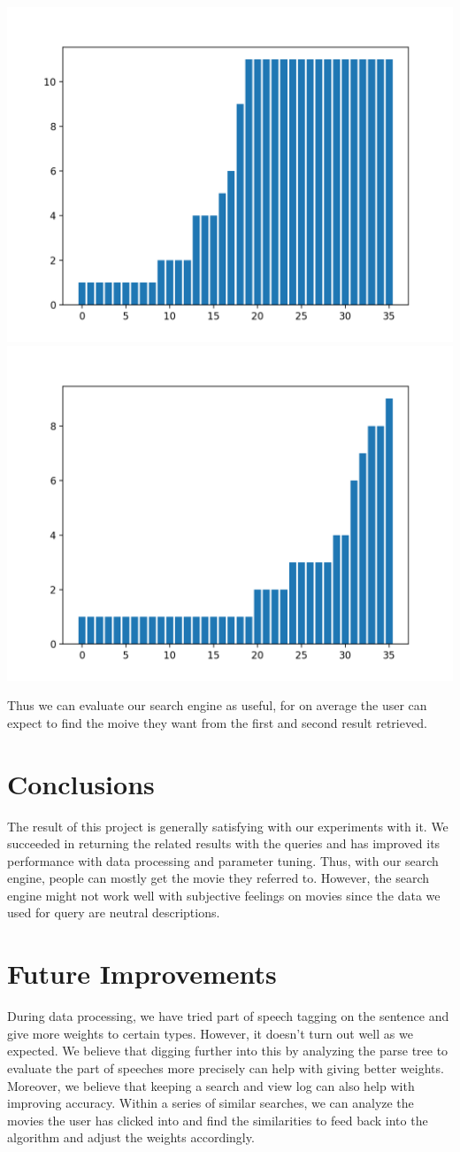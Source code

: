 \documentclass[letterpaper,10pt]{article}
\newenvironment{Figure}
  {\par\medskip\noindent\minipage{\linewidth}}
  {\endminipage\par\medskip}
\begin{document}
\begin{multicols}{2}
    \begin{Figure}
        \center
        \includegraphics[width=0.47\linewidth]{evaluation_1.png}
        \includegraphics[width=0.47\linewidth]{evaluation_2.png}
    \end{Figure}

    Thus we can evaluate our search engine as useful, for on average the user
    can expect to find the moive they want from the first and second result
    retrieved.

    \section{Conclusions}

    The result of this project is generally satisfying with our experiments with
    it. We succeeded in returning the related results with the queries and has
    improved its performance with data processing and parameter tuning. Thus,
    with our search engine, people can mostly get the movie they referred to.
    However, the search engine might not work well with subjective feelings on
    movies since the data we used for query are neutral descriptions.

    \section{Future Improvements}
    During data processing, we have tried part of speech tagging on the sentence and give more weights to certain types. However, it doesn’t turn out well as we expected. We believe that digging further into this by analyzing the parse tree to evaluate the part of speeches more precisely can help with giving better weights.
    Moreover, we believe that keeping a search and view log can also help with improving accuracy. Within a series of similar searches, we can analyze the movies the user has clicked into and find the similarities to feed back into the algorithm and adjust the weights accordingly.


\end{multicols}
\end{document}
